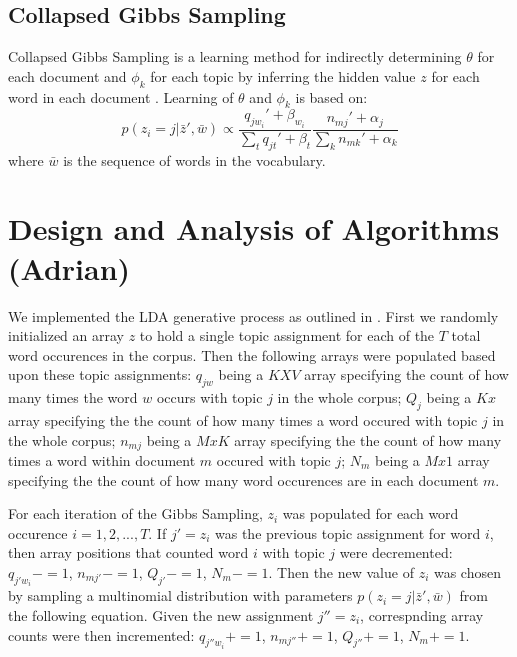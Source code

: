 \documentclass[10pt]{article}
\begin{document}
\subsection{Collapsed Gibbs Sampling}
\label{sec:gibbs}
Collapsed Gibbs Sampling is a learning method for indirectly determining $\theta$ for each document and $\phi_k$ for each topic by inferring the hidden value $z$ for each word in each document \cite{CSE250B}. Learning of $\theta$ and $\phi_k$ is based on:
\begin{equation}
    p(z_i = j | \bar{z}', \bar{w}) \propto \frac{q_{j w_i}' + \beta_{w_i}}{\sum_t q_{jt}' + \beta_t} \frac{n_{mj}' + \alpha_j}{\sum_k n_{mk}' + \alpha_k}
\end{equation}
where $\bar{w}$ is the sequence of words in the vocabulary.



\section{Design and Analysis of Algorithms (Adrian)}
\label{sec:algorithms}

We implemented the LDA generative process as outlined in \cite{CSE250B}. First we randomly initialized an array $z$ to hold a single topic assignment for each of the $T$ total word occurences in the corpus. Then the following arrays were populated based upon these topic assignments: $q_{jw}$ being a $K X V$ array specifying the count of how many times the word $w$ occurs with topic $j$ in the whole corpus; $Q_{j}$ being a $K x $ array specifying the the count of how many times a word occured with topic $j$ in the whole corpus; $n_{mj}$ being a $M x K$ array specifying the the count of how many times a word within document $m$ occured with topic $j$; $N_{m}$ being a $M x 1$ array specifying the the count of how many word occurences are in each document $m$.

For each iteration of the Gibbs Sampling, $z_i$ was populated for each word occurence $i = 1, 2, ..., T$. If $j' = z_i$ was the previous topic assignment for word $i$, then array positions that counted word $i$ with topic $j$ were decremented: $q_{j' w_i} -= 1$, $n_{mj'} -= 1$, $Q_{j'} -= 1$, $N_{m} -= 1$. Then the new value of $z_i$ was chosen by sampling a multinomial distribution with parameters $p(z_i = j | \bar{z}', \bar{w})$ from the following equation. Given the new assignment $j'' = z_i$, correspnding array counts were then incremented: $q_{j'' w_i} += 1$, $n_{mj''} += 1$, $Q_{j''} += 1$, $N_{m} += 1$.
\end{document}
